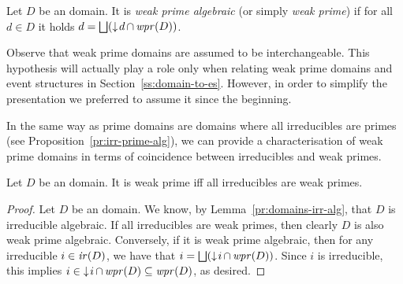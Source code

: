\begin{definition}
  \label{de:fusion-domain-new}
  Let $D$ be an {\wi} domain.  It is \emph{weak prime algebraic} (or simply
  \emph{weak prime}) if for all $d \in D$ it holds
  $d = \bigsqcup (\mathop{\downarrow\!{d}} \cap \mathop{\mathit{wpr}({D})})$.
\end{definition}

Observe that weak prime domains are assumed to be interchangeable. This hypothesis will actually play a role only when relating weak prime domains and event structures in Section~\ref{ss:domain-to-es}. However, in order to simplify the presentation we preferred to assume it since the beginning.





In the same way as prime domains are domains where all
irreducibles are primes (see Proposition~\ref{pr:irr-prime-alg}), we
can provide a characterisation of weak prime domains in terms of
coincidence between irreducibles and weak primes.

\begin{proposition}
  \label{pr:fusion-domains}
  Let $D$ be an {\wi} domain.
  It is weak prime iff  all irreducibles are weak primes.
\end{proposition}


\begin{proof}
  Let $D$ be an {\wi} domain. We know, by
  Lemma~\ref{pr:domains-irr-alg}, that $D$ is irreducible
  algebraic. If all irreducibles are weak primes, then clearly $D$ is
  also weak prime algebraic. Conversely, if it is weak prime
  algebraic, then for any irreducible $i \in \mathop{\mathit{ir}({D})}$, we have that
  $i = \bigsqcup (\mathop{\downarrow\!{i}} \cap \mathop{\mathit{wpr}({D})})$. Since $i$ is
  irreducible, this implies
  $i \in \mathop{\downarrow\!{i}} \cap \mathop{\mathit{wpr}({D})} \subseteq \mathop{\mathit{wpr}({D})}$, as desired.
\end{proof}




